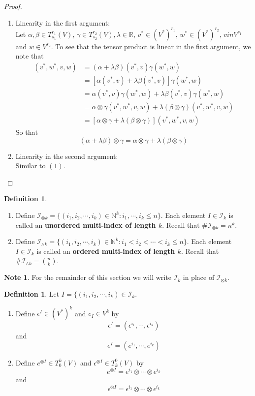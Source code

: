 \documentclass{book}
\theoremstyle{definition}
\newtheorem{defn}[definition]{Definition}
\newtheorem{note}[definition]{Note}
\newcommand{\al}{\alpha}
\newcommand{\be}{\beta}
\newcommand{\gam}{\gamma}
\newcommand{\ep}{\epsilon}
\newcommand{\lam}{\lambda}
\newcommand{\N}{\mathbb{N}}
\newcommand{\R}{\mathbb{R}}
\newcommand{\MI}{\mathcal{I}}
\DeclareMathOperator*{\0}{\mbf{0}}
\DeclareMathOperator*{\1}{\mbf{1}}
\newcommand{\tbf}[1]{\textbf{#1}}
\newcommand{\Tn}[1]{T^{r_{#1}}_{s_{#1}}(V)}
\begin{document}
	\begin{proof}\
	\begin{enumerate}
	\item Linearity in the first argument:\\
	Let $\al, \be \in \Tn{1}$, $ \gam \in \Tn{2}, \lam \in \R$, $v^* \in (V^*)^{r_1}$, $w^* \in (V^*)^{r_2}$, $v in V^{s_1}$ and $w \in V^{s_2}$. To see that the tensor product is linear in the first argument, we note that  
	\begin{align*}
	[(\al + \lam \be) \otimes \gam] (v^*, w^*, v, w) 
	&= (\al + \lam \be)(v^*, v) \gam(w^*, w) \\
	&= [\al(v^*, v) + \lam \be (v^*, v)] \gam (w^*, w) \\
	&= \al(v^*, v) \gam (w^*, w) + \lam \be (v^*, v) \gam (w^*, w) \\
	&= \al \otimes \gam (v^*, w^*, v, w)  + \lam (\be \otimes \gam) (v^*, w^*, v, w) \\
	&= [\al \otimes \gam + \lam (\be \otimes \gam)] (v^*, w^*, v, w) 
	\end{align*}
	So that $$(\al + \lam \be) \otimes \gam = \al \otimes \gam + \lam (\be \otimes \gam)$$
	\item Linearity in the second argument:\\
	Similar to $(1)$.
	\end{enumerate}
\end{proof}			
	
	
	\begin{defn}\
		\begin{enumerate}
		\item Define $\MI_{\otimes k} = \{(i_1, i_2, \cdots, i_k) \in \N^k: i_1,  \cdots,  i_k \leq n \}$. Each element $I \in \MI_{k}$ is called an \tbf{unordered multi-index of length $k$}. Recall that $\# \MI_{\otimes k} = n^k$. \\
		\item Define $\MI_{\wedge k} = \{(i_1, i_2, \cdots, i_k) \in \N^k: i_1 < i_2 < \cdots < i_k \leq n \}$. Each element $I \in \MI_{k}$ is called an \tbf{ordered multi-index of length $k$}. Recall that $\# \MI_{\wedge k} = {n \choose k}$. 
		\end{enumerate}
	\end{defn}
	
	\begin{note}
	For the remainder of this section we will write $\MI_k$ in place of $\MI_{\otimes k}$.
	\end{note}

	\begin{defn}
		Let $I = \{(i_1, i_2, \cdots, i_k) \in \MI_k$. \\ 
		\begin{enumerate}
		\item Define $\ep^I \in (V^*)^k$ and $e_I \in V^k$  by  $$\ep^I = (\ep^{i_1}, \cdots, \ep^{i_k})$$ 
		and 
		$$e^I = (e^{i_1}, \cdots, e^{i_k})$$ 
		\item Define $e^{\otimes I} \in T^k_0(V)$ and $\ep^{\otimes I} \in T^0_k(V)$ by 
		$$e^{\otimes I} = e^{i_1} \otimes \cdots \otimes e^{i_k}$$ 
		and 
		$$\ep^{\otimes I} = \ep^{i_1} \otimes \cdots \otimes \ep^{i_k}$$
		\end{enumerate}
	\end{defn}
	
\end{document}
